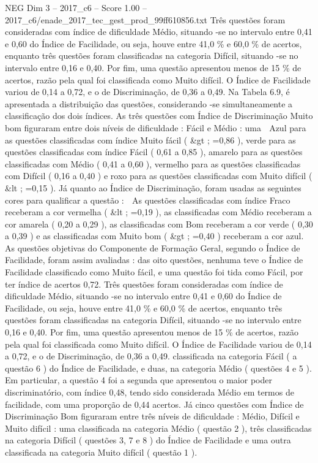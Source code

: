 \begin{textsample}{NEG Dim 3 – 2017\_c6 – Score 1.00 – 2017\_c6/enade\_2017\_tec\_gest\_prod\_99ff610856.txt}
Três questões foram consideradas com índice de dificuldade Médio, situando -se no intervalo entre 0,41 e 0,60 do Índice de Facilidade, ou seja, houve entre 41,0 \% e 60,0 \% de acertos, enquanto três questões foram classificadas na categoria Difícil, situando -se no intervalo entre 0,16 e 0,40.
Por fim, uma questão apresentou menos de 15 \% de acertos, razão pela qual foi classificada como Muito difícil.
O Índice de Facilidade variou de 0,14 a 0,72, e o de Discriminação, de 0,36 a 0,49.
Na Tabela 6.9, é apresentada a distribuição das questões, considerando -se simultaneamente a classificação dos dois índices.
As três questões com Índice de Discriminação Muito bom figuraram entre dois níveis de dificuldade : Fácil e Médio : uma  Azul para as questões classificadas com índice Muito fácil ( \&gt ; =0,86 ), verde para as questões classificadas com índice Fácil ( 0,61 a 0,85 ), amarelo para as questões classificadas com Médio ( 0,41 a 0,60 ), vermelho para as questões classificadas com Difícil ( 0,16 a 0,40 ) e roxo para as questões classificadas com Muito difícil ( \&lt ; =0,15 ).
Já quanto ao Índice de Discriminação, foram usadas as seguintes cores para qualificar a questão :  As questões classificadas com índice Fraco receberam a cor vermelha ( \&lt ; =0,19 ), as classificadas com Médio receberam a cor amarela ( 0,20 a 0,29 ), as classificadas com Bom receberam a cor verde ( 0,30 a 0,39 ) e as classificadas com Muito bom ( \&gt ; =0,40 ) receberam a cor azul.
As questões objetivas do Componente de Formação Geral, segundo o Índice de Facilidade, foram assim avaliadas : das oito questões, nenhuma teve o Índice de Facilidade classificado como Muito fácil, e uma questão foi tida como Fácil, por ter índice de acertos 0,72.
Três questões foram consideradas com índice de dificuldade Médio, situando -se no intervalo entre 0,41 e 0,60 do Índice de Facilidade, ou seja, houve entre 41,0 \% e 60,0 \% de acertos, enquanto três questões foram classificadas na categoria Difícil, situando -se no intervalo entre 0,16 e 0,40.
Por fim, uma questão apresentou menos de 15 \% de acertos, razão pela qual foi classificada como Muito difícil.
O Índice de Facilidade variou de 0,14 a 0,72, e o de Discriminação, de 0,36 a 0,49. classificada na categoria Fácil ( a questão 6 ) do Índice de Facilidade, e duas, na categoria Médio ( questões 4 e 5 ).
Em particular, a questão 4 foi a segunda que apresentou o maior poder discriminatório, com índice 0,48, tendo sido considerada Médio em termos de facilidade, com uma proporção de 0,44 acertos.
Já cinco questões com Índice de Discriminação Bom figuraram entre três níveis de dificuldade : Médio, Difícil e Muito difícil : uma classificada na categoria Médio ( questão 2 ), três classificadas na categoria Difícil ( questões 3, 7 e 8 ) do Índice de Facilidade e uma outra classificada na categoria Muito difícil ( questão 1 ).

\end{textsample}
